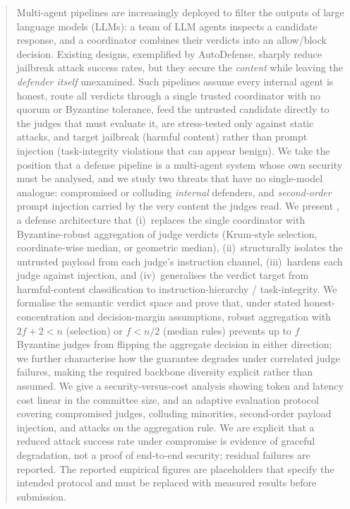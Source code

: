 \begin{abstract}
Multi-agent pipelines are increasingly deployed to filter the outputs of large
language models (LLMs): a team of LLM agents inspects a candidate response, and a
coordinator combines their verdicts into an allow/block decision. Existing designs,
exemplified by AutoDefense, sharply reduce jailbreak attack success rates, but they
secure the \emph{content} while leaving the \emph{defender itself} unexamined. Such
pipelines assume every internal agent is honest, route all verdicts through a single
trusted coordinator with no quorum or Byzantine tolerance, feed the untrusted
candidate directly to the judges that must evaluate it, are stress-tested only against
static attacks, and target jailbreak (harmful content) rather than prompt injection
(task-integrity violations that can appear benign). We take the position that a defense
pipeline is a multi-agent system whose own security must be analysed, and we study two
threats that have no single-model analogue: compromised or colluding \emph{internal}
defenders, and \emph{second-order} prompt injection carried by the very content the
judges read. We present \Aegis, a defense architecture that (i)~replaces the single
coordinator with Byzantine-robust aggregation of judge verdicts (Krum-style selection,
coordinate-wise median, or geometric median), (ii)~structurally isolates the untrusted
payload from each judge's instruction channel, (iii)~hardens each judge against
injection, and (iv)~generalises the verdict target from harmful-content classification
to instruction-hierarchy / task-integrity. We formalise the semantic verdict space and
prove that, under stated honest-concentration and decision-margin assumptions, robust
aggregation with $2f{+}2<n$ (selection) or $f<n/2$ (median rules) prevents up to $f$
Byzantine judges from flipping the aggregate decision in either direction; we further
characterise how the guarantee degrades under correlated judge failures, making the
required backbone diversity explicit rather than assumed. We give a security-versus-cost
analysis showing token and latency cost linear in the committee size, and an adaptive
evaluation protocol covering compromised judges, colluding minorities, second-order
payload injection, and attacks on the aggregation rule. We are explicit that a reduced
attack success rate under compromise is evidence of graceful degradation, not a proof
of end-to-end security; residual failures are reported. The reported empirical figures
are placeholders that specify the intended protocol and must be replaced with measured
results before submission.
\end{abstract}

